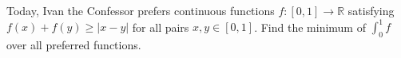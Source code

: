 Today, Ivan the Confessor prefers continuous functions \(f\colon [0,1]\to\mathbb{R}\) satisfying \(f(x)+f(y)\geq |x-y|\) for all pairs \(x,y\in [0,1]\). Find the minimum of \(\int_0^1 f\) over all preferred functions.